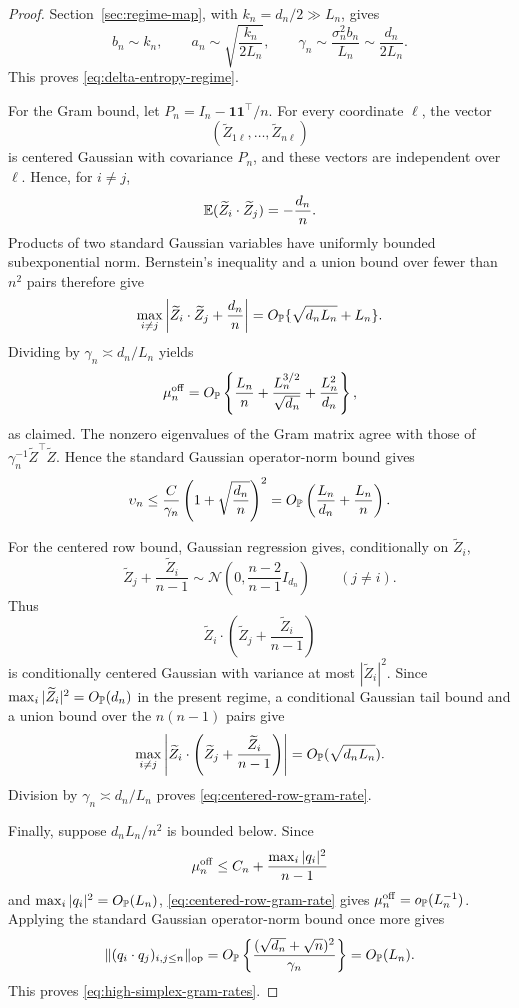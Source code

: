 \begin{proof}
Section~\ref{sec:regime-map}, with \(k_n=d_n/2\gg L_n\), gives
\[
  b_n\sim k_n,\qquad
  a_n\sim\sqrt{\frac{k_n}{2L_n}},\qquad
  \gamma_n\sim\frac{\sigma_n^2b_n}{L_n}
  \sim\frac{d_n}{2L_n}.
\]
This proves \eqref{eq:delta-entropy-regime}.

For the Gram bound, let \(P_n=I_n-\mathbf1\mathbf1^\top/n\). For every
coordinate \(\ell\), the vector
\[
  (\widetilde Z_{1\ell},\ldots,\widetilde Z_{n\ell})
\]
is centered Gaussian with covariance \(P_n\), and these vectors are
independent over \(\ell\). Hence, for \(i\ne j\),
\[
  \mathbb E(\widetilde Z_i\cdot\widetilde Z_j)=-\frac{d_n}{n}.
\]
Products of two standard Gaussian variables have uniformly bounded
subexponential norm. Bernstein's inequality and a union bound over fewer than
\(n^2\) pairs therefore give
\[
  \max_{i\ne j}
  \left|
    \widetilde Z_i\cdot\widetilde Z_j+\frac{d_n}{n}
  \right|
  =
  O_{\mathbb P}\{\sqrt{d_nL_n}+L_n\}.
\]
Dividing by \(\gamma_n\asymp d_n/L_n\) yields
\[
  \mu_n^{\rm off}
  =
  O_{\mathbb P}\left\{
    \frac{L_n}{n}
    +\frac{L_n^{3/2}}{\sqrt{d_n}}
    +\frac{L_n^2}{d_n}
  \right\},
\]
as claimed.  The nonzero eigenvalues of the Gram matrix agree with those of
\(\gamma_n^{-1}\widetilde Z^\top\widetilde Z\).  Hence the standard
Gaussian operator-norm bound gives
\[
 \upsilon_n
 \le
 \frac{C}{\gamma_n}
 \left(1+\sqrt{\frac{d_n}{n}}\right)^2
 =
 O_{\mathbb P}\left(\frac{L_n}{d_n}+\frac{L_n}{n}\right).
\]

For the centered row bound, Gaussian regression gives, conditionally on
\(\widetilde Z_i\),
\[
 \widetilde Z_j+\frac{\widetilde Z_i}{n-1}
 \sim
 \mathcal N\left(0,\frac{n-2}{n-1}I_{d_n}\right)
 \qquad (j\ne i).
\]
Thus
\[
 \widetilde Z_i\cdot
 \left(\widetilde Z_j+\frac{\widetilde Z_i}{n-1}\right)
\]
is conditionally centered Gaussian with variance at most
\(|\widetilde Z_i|^2\).  Since
\(\max_i|\widetilde Z_i|^2=O_{\mathbb P}(d_n)\) in the present regime, a
conditional Gaussian tail bound and a union bound over the \(n(n-1)\)
pairs give
\[
 \max_{i\ne j}
 \left|
 \widetilde Z_i\cdot
 \left(\widetilde Z_j+\frac{\widetilde Z_i}{n-1}\right)
 \right|
 =O_{\mathbb P}(\sqrt{d_nL_n}).
\]
Division by \(\gamma_n\asymp d_n/L_n\) proves
\eqref{eq:centered-row-gram-rate}.

Finally, suppose \(d_nL_n/n^2\) is bounded below.  Since
\[
 \mu_n^{\rm off}\le C_n+\frac{\max_i|q_i|^2}{n-1}
\]
and \(\max_i|q_i|^2=O_{\mathbb P}(L_n)\),
\eqref{eq:centered-row-gram-rate} gives
\(\mu_n^{\rm off}=o_{\mathbb P}(L_n^{-1})\).  Applying the standard Gaussian
operator-norm bound once more gives
\[
 \|(q_i\cdot q_j)_{i,j\le n}\|_{\rm op}
 =
 O_{\mathbb P}\left\{\frac{(\sqrt{d_n}+\sqrt n)^2}{\gamma_n}\right\}
 =
 O_{\mathbb P}(L_n).
\]
This proves \eqref{eq:high-simplex-gram-rates}.
\end{proof}


